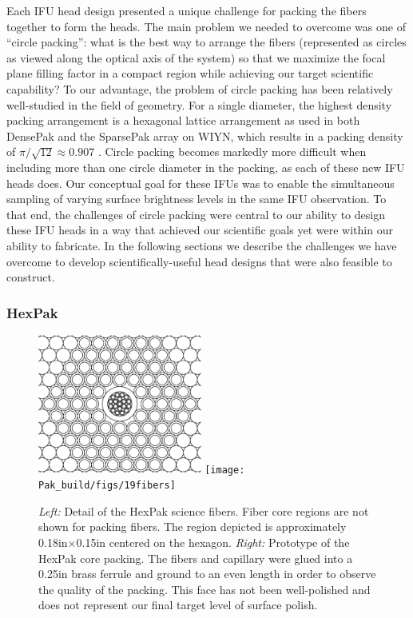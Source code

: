 Each IFU head design presented a unique challenge for packing the fibers
together to form the heads.  The main problem we needed to overcome was one of
``circle packing'': what is the best way to arrange the fibers (represented as
circles as viewed along the optical axis of the system) so that we maximize
the focal plane filling factor in a compact region while achieving our target
scientific capability?  To our advantage, the problem of circle packing has
been relatively well-studied in the field of geometry.  For a single diameter,
the highest density packing arrangement is a hexagonal lattice arrangement as
used in both DensePak and the SparsePak array on WIYN, which results in a
packing density of $\pi/\sqrt{12} \approx 0.907$ \citep{Steinhaus99}.  Circle
packing becomes markedly more difficult when including more than one circle
diameter in the packing, as each of these new IFU heads does.  Our conceptual
goal for these IFUs was to enable the simultaneous sampling of varying surface
brightness levels in the same IFU observation.  To that end, the challenges of
circle packing were central to our ability to design these IFU heads in a way
that achieved our scientific goals yet were within our ability to fabricate.
In the following sections we describe the challenges we have overcome to
develop scientifically-useful head designs that were also feasible to
construct.


\subsubsection{HexPak}
\label{GPBsubsub:sec:hexhead}

\begin{figure}
    \includegraphics[width=0.48\textwidth]{Pak_build/figs/hexpak_zoom}
    \hfill
    \texttt{[image: Pak\_build/figs/19fibers]}
    \vspace{1.5mm}
    \caption[HexPak Science Fibers]{\fixspacing \emph{Left:} Detail of the
      HexPak science fibers.  Fiber core regions are not shown for packing
      fibers.  The region depicted is approximately 0.18in$\times$0.15in
      centered on the hexagon.  \emph{Right:} Prototype of the HexPak core
      packing.  The fibers and capillary were glued into a 0.25in brass
      ferrule and ground to an even length in order to observe the quality of
      the packing.  This face has not been well-polished and does not
      represent our final target level of surface polish.
    \label{fig:hex_head}}
\end{figure}


